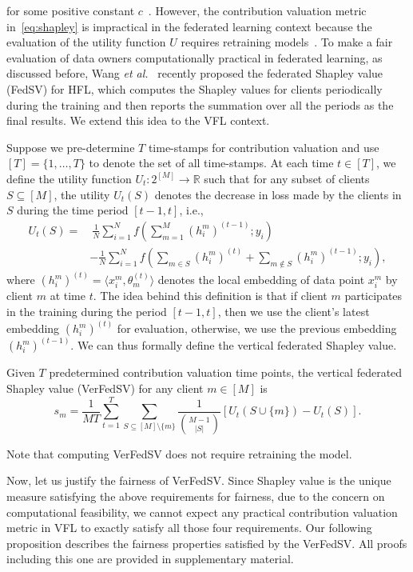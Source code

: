 for some positive constant $c$~\cite{dubey1975uniqueness,ghorbani2019data}. However, the contribution valuation metric in~\eqref{eq:shapley} is impractical in the federated learning context because the evaluation of the utility function $U$ requires retraining models~\cite{ghorbani2019data,wang2020principled}. To make a fair evaluation of data owners computationally practical in federated learning, as discussed before, Wang \textit{et al.}~\cite{wang2020principled} recently proposed the federated Shapley value (FedSV) for HFL, which computes the Shapley values for clients periodically during the training and then reports the summation over all the periods as the final results. We extend this idea to the VFL context. 

Suppose we pre-determine $T$ time-stamps for contribution valuation and use $[T] = \{1,\dots, T\}$ to denote the set of all time-stamps. At each time $t \in [T]$, we define the utility function $U_t:2^{[M]}\to\mathbb{R}$ such that for any subset of clients $S \subseteq [M]$, the utility $U_t(S)$ denotes the decrease in loss made by the clients in $S$ during the time period $[t-1, t]$, i.e., 
\begin{align} \label{eq:utility2}
    U_t(S) = &~ \frac{1}{N} \sum_{i=1}^N f\left( \sum_{m=1}^M (h_i^m)^{(t-1)}; y_i\right) \nonumber
    \\& - \frac{1}{N} \sum_{i=1}^N f\left( \sum_{m\in S} (h_i^m)^{(t)} + \sum_{m\notin S} (h_i^m)^{(t-1)}; y_i\right),
\end{align}
where $(h_i^m)^{(t)} = \langle x_i^m, \theta_m^{(t)} \rangle$ denotes the local embedding of data point $x_i^m$ by client $m$ at time $t$. The idea behind this definition is that if client $m$ participates in the training during the period $[t-1, t]$, then we use the client's latest embedding $(h_i^m)^{(t)}$ for evaluation, otherwise, we use the previous embedding $(h_i^m)^{(t-1)}$. We can thus formally define the vertical federated Shapley value.
\begin{definition} \label{def:vertical_fedsv}
    Given $T$ predetermined contribution valuation time points, the vertical federated Shapley value (VerFedSV) for any client $m \in [M]$ is
    \[s_m = \frac{1}{MT}\sum_{t=1}^T\sum_{S \subseteq [M] \setminus \{m\}} \frac{1}{\binom{M-1}{|S|}} [U_t(S\cup\{m\}) - U_t(S)].\]
\end{definition}
Note that computing VerFedSV does not require retraining the model. 

Now, let us justify the fairness of VerFedSV. Since Shapley value is the unique measure satisfying the above requirements for fairness, due to the concern on computational feasibility, we cannot expect any practical contribution valuation metric in VFL to exactly satisfy all those four requirements. Our following proposition describes the fairness properties satisfied by the VerFedSV. All proofs including this one are provided in supplementary material.

